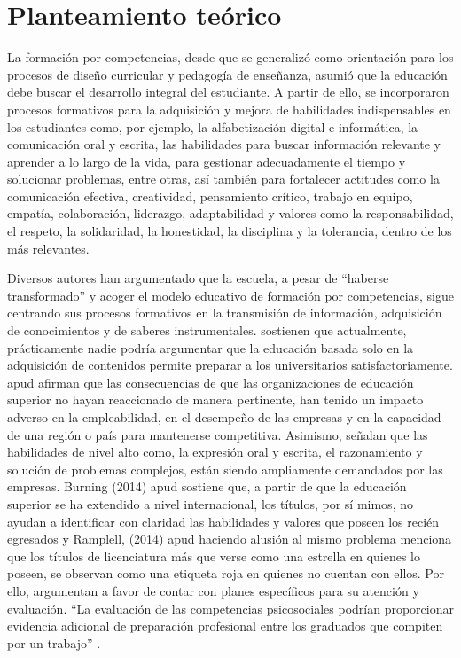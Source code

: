 \documentclass[spanish]{textolivre}
\begin{document}
\section{Planteamiento teórico}
La formación por competencias, desde que se generalizó como orientación para los procesos de diseño curricular y pedagogía de enseñanza, asumió que la educación debe buscar el desarrollo integral del estudiante. A partir de ello, se incorporaron procesos formativos para la adquisición y mejora de habilidades indispensables en los estudiantes como, por ejemplo, la alfabetización digital e informática, la comunicación oral y escrita, las habilidades para buscar información relevante y aprender a lo largo de la vida, para gestionar adecuadamente el tiempo y solucionar problemas, entre otras, así también para fortalecer actitudes como la comunicación efectiva, creatividad, pensamiento crítico, trabajo en equipo, empatía, colaboración, liderazgo, adaptabilidad y valores como la responsabilidad, el respeto, la solidaridad, la honestidad, la disciplina y la tolerancia, dentro de los más relevantes.

Diversos autores \cite{cejasmartinez2019, asuninostroza2013, torres2012, fernandez2010, davis2015} han argumentado que la escuela, a pesar de “haberse transformado” y acoger el modelo educativo de formación por competencias, sigue centrando sus procesos formativos en la transmisión de información, adquisición de conocimientos y de saberes instrumentales. \textcite{oliveri2017} sostienen que actualmente, prácticamente nadie podría argumentar que la educación basada solo en la adquisición de contenidos permite preparar a los universitarios satisfactoriamente. \textcite{coley} apud \textcite[p. 1]{oliveri2017} afirman que las consecuencias de que las organizaciones de educación superior no hayan reaccionado de manera pertinente, han tenido un impacto adverso en la empleabilidad, en el desempeño de las empresas y en la capacidad de una región o país para mantenerse competitiva. Asimismo, señalan que las habilidades de nivel alto como, la expresión oral y escrita, el razonamiento y solución de problemas complejos, están siendo ampliamente demandados por las empresas. Burning (2014) apud \textcite[p. 3]{oliveri2017} sostiene que, a partir de que la educación superior se ha extendido a nivel internacional, los títulos, por sí mimos, no ayudan a identificar con claridad las habilidades y valores que poseen los recién egresados y Ramplell, (2014) apud \textcite[p. 1]{oliveri2017} haciendo alusión al mismo problema menciona que los títulos de licenciatura más que verse como una estrella en quienes lo poseen, se observan como una etiqueta roja en quienes no cuentan con ellos. Por ello, argumentan a favor de contar con planes específicos para su atención y evaluación. “La evaluación de las competencias psicosociales podrían proporcionar evidencia adicional de preparación profesional entre los graduados que compiten por un trabajo” \cite[p. 63]{davis2015}.
\end{document}
